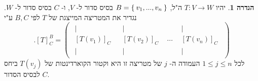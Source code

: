 \documentclass[12pt]{report}
\theoremstyle{plain}
\theoremstyle{definition}
\newtheorem{definition}[theorem]{הגדרה}
\newcommand{\0}{\mathbf{0}}
\begin{document}
\begin{definition}
יהיו
$T:V\to W$
ה"ל,
$B=\Set{v_1,...,v_n}$
בסיס סדור ל-
$V$,
ו-
$C$
בסיס סדור ל-
$W$.
נגדיר את המטריצה המייצגת של
$T$
לפי
$B,C$
ע"י
$$
.[T]_C^B=\begin{pmatrix}
\begin{array}{c}
|\\[-0.4ex]
[T(v_1)]_C\\[-0.4ex]
|
\end{array}
&
\begin{array}{c}
|\\[-0.4ex]
[T(v_2)]_C\\[-0.4ex]
|
\end{array}
&
\cdots
&
\begin{array}{c}
|\\[-0.4ex]
[T(v_n)]_C\\[-0.4ex]
|
\end{array}
\end{pmatrix}
$$
לכל
$1\leq j\leq n$
העמודה ה-
$j$
של מטריצה זו היא וקטור הקוארדינטות של
$T(v_j)$
ביחס לבסיס הסדור
$C$.
\end{definition}
\end{document}
